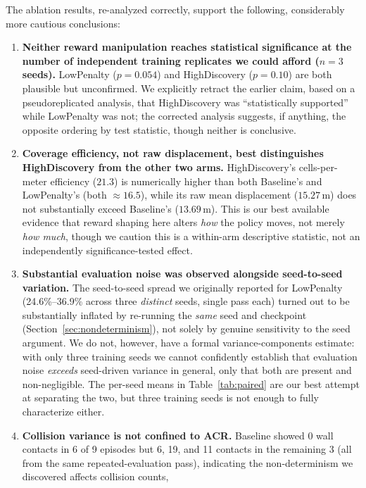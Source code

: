 \documentclass[11pt]{article}
\begin{document}
The ablation results, re-analyzed correctly, support the following,
considerably more cautious conclusions:
\begin{enumerate}
    \item \textbf{Neither reward manipulation reaches statistical
    significance at the number of independent training replicates we
    could afford ($n=3$ seeds).} LowPenalty ($p=0.054$) and HighDiscovery
    ($p=0.10$) are both plausible but unconfirmed. We explicitly retract
    the earlier claim, based on a pseudoreplicated analysis, that
    HighDiscovery was ``statistically supported'' while LowPenalty was
    not; the corrected analysis suggests, if anything, the opposite
    ordering by test statistic, though neither is conclusive.
    \item \textbf{Coverage efficiency, not raw displacement, best
    distinguishes HighDiscovery from the other two arms.} HighDiscovery's
    cells-per-meter efficiency ($21.3$) is numerically higher than both
    Baseline's and LowPenalty's (both $\approx 16.5$), while its raw mean
    displacement ($15.27\,$m) does not substantially exceed Baseline's
    ($13.69\,$m). This is our best available evidence that reward shaping
    here alters \emph{how} the policy moves, not merely \emph{how much},
    though we caution this is a within-arm descriptive statistic, not an
    independently significance-tested effect.
    \item \textbf{Substantial evaluation noise was observed alongside
    seed-to-seed variation.} The seed-to-seed spread we originally
    reported for LowPenalty (24.6\%--36.9\% across three \emph{distinct}
    seeds, single pass each) turned out to be substantially inflated by
    re-running the \emph{same} seed and checkpoint
    (Section~\ref{sec:nondeterminism}), not solely by genuine sensitivity
    to the seed argument. We do not, however, have a formal
    variance-components estimate: with only three training seeds we
    cannot confidently establish that evaluation noise \emph{exceeds}
    seed-driven variance in general, only that both are present and
    non-negligible. The per-seed means in Table~\ref{tab:paired} are our
    best attempt at separating the two, but three training seeds is not
    enough to fully characterize either.
    \item \textbf{Collision variance is not confined to ACR.} Baseline
    showed 0 wall contacts in 6 of 9 episodes but 6, 19, and 11 contacts
    in the remaining 3 (all from the same repeated-evaluation pass),
    indicating the non-determinism we discovered affects collision counts,

\end{enumerate}
\end{document}
